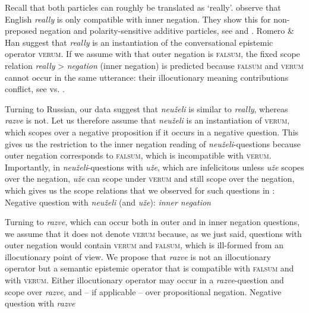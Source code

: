 \documentclass[output=paper,colorlinks,citecolor=brown]{langscibook}
\begin{document}
Recall that both particles can roughly be translated as `really'. \citet{romerohan2004negative} observe that English \textit{really} is only compatible with inner negation. They show this for non-preposed negation and polarity-sensitive additive particles, see  and . Romero \& Han suggest that \textit{really} is an instantiation of the conversational epistemic operator \textsc{verum}. If we assume with \citet{Repp06, repp_negation_2009, Repp13} that outer negation is \textsc{falsum}, the fixed scope relation \textit{really} > \textit{negation} (inner negation) is predicted because \textsc{falsum} and \textsc{verum} cannot occur in the same utterance: their illocutionary meaning contributions conflict, see  vs. .
\ea \label{ex:05:neg:out}
\label{ex:05:neg:out:a}
\z
\ex \label{ex:05:neg:in}
\label{ex:05:neg:in:a}
\z
\z

Turning to Russian, our data suggest that \textit{neuželi} is similar to \textit{really}, whereas \textit{razve} is not. Let us therefore assume that \textit{neuželi} is an instantiation of \textsc{verum}, which scopes over a negative proposition if it occurs in a negative question. This gives us the restriction to the inner negation reading of \textit{neuželi}-questions because outer negation corresponds to \textsc{falsum}, which is incompatible with \textsc{verum}. Importantly, in \textit{neuželi}-questions with \textit{uže}, which are infelicitous unless \textit{uže} scopes over the negation, \textit{uže} can scope under \textsc{verum} and still scope over the negation, which gives us the scope relations that we observed for such questions in :
\ea\label{neg:question}
Negative question with \textit{neuželi} (and \textit{uže}): \textit{inner negation}
\z

Turning to \textit{razve}, which can occur both in outer and in inner negation questions, we assume that it does not denote \textsc{verum} because, as we just said, questions with outer negation would contain \textsc{verum} and \textsc{falsum}, which is ill-formed from an illocutionary point of view. We propose that \textit{razve} is not an illocutionary operator but a semantic epistemic operator that is compatible with \textsc{falsum} and with \textsc{verum}. Either illocutionary operator may occur in a \textit{razve}-question and scope over \textit{razve}, and – if applicable – over propositional negation. 
\ea\label{neg:raz} Negative question with \textit{razve}
 
 
\z
\z
\end{document}
